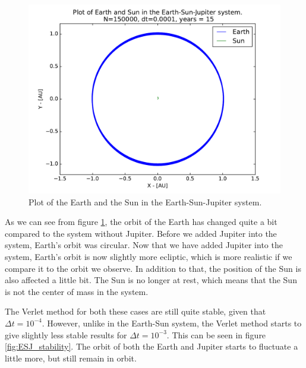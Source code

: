 \documentclass[12pt]{article}
\begin{document}
\begin{figure}[!h]
\centering
\includegraphics[width=\linewidth]{Plots/ESJ_EarthandSun.pdf}
\caption{Plot of the Earth and the Sun in the Earth-Sun-Jupiter system.}
\label{fig:EJS_Earth_and_sun}
\end{figure}

As we can see from figure \ref{fig:EJS_Earth_and_sun}, the orbit of the Earth has changed quite a bit compared to the system without Jupiter. Before we added Jupiter into the system, Earth's orbit was circular. Now that we have added Jupiter into the system, Earth's orbit is now slightly more ecliptic, which is more realistic if we compare it to the orbit we observe. In addition to that, the position of the Sun is also affected a little bit. The Sun is no longer at rest, which means that the Sun is not the center of mass in the system.

The Verlet method for both these cases are still quite stable, given that $\Delta t = 10^{-4}$. However, unlike in the Earth-Sun system, the Verlet method starts to give slightly less stable results for $\Delta t = 10^{-3}$. This can be seen in figure \ref{fig:ESJ_stability}. The orbit of both the Earth and Jupiter starts to fluctuate a little more, but still remain in orbit.
\end{document}
